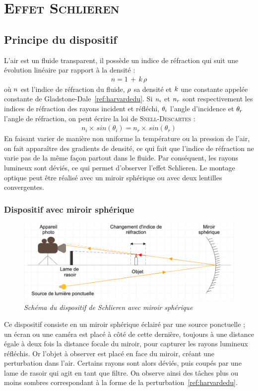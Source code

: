\renewcommand{\chaptername}{\scshape Partie}
\chapter{\normalfont \scshape Effet Schlieren}
\section{Principe du dispositif}
L'air est un fluide transparent, il possède un indice de réfraction qui suit une évolution linéaire par rapport à la densité :
\begin{align}
	n = 1\,+\,k\,\rho
\end{align}
où $\mathnormal{n}$ est l'indice de réfraction du fluide, $\mathnormal{\rho}$ sa densité et $\mathnormal{k}$ une constante appelée constante de Gladstone-Dale~\ref{ref:harvardedu}. Si $\mathnormal{n_i}$ et $\mathnormal{n_r}$ sont respectivement les indices de réfraction des rayons incident et réfléchi, $\mathnormal{\theta_i}$ l'angle d'incidence et $\mathnormal{\theta_r}$ l'angle de réfraction, on peut écrire la loi de \textsc{Snell-Descartes} :
\begin{align}
	n_i\times\,sin(\theta_i) = n_r\times\,sin(\theta_r) 
\end{align}
En faisant varier de manière non uniforme la température ou la pression de l'air, on fait apparaître des gradients de densité, ce qui fait que l'indice de réfraction ne varie pas de la même façon partout dans le fluide. Par conséquent, les rayons lumineux sont déviés, ce qui permet d'observer l'effet Schlieren. Le montage optique peut être réalisé avec un miroir sphérique ou avec deux lentilles convergentes.
\subsection{Dispositif avec miroir sphérique}
\begin{figure}[H]
	\centering
	\includegraphics[scale = 0.4]{figures/schlieren_miroir.png}
	\caption{\small{\textit{Schéma du dispositif de Schlieren avec miroir sphérique}}}
	\label{fig:schlieren_miroir}
\end{figure}
Ce dispositif consiste en un miroir sphérique éclairé par une source ponctuelle ; un écran ou une caméra est placé à côté de cette dernière, toujours à une distance égale à deux fois la distance focale du miroir, pour capturer les rayons lumineux réfléchis. Or l’objet à observer est placé en face du miroir, créant une perturbation dans l’air. Certains rayons sont alors déviés, puis coupés par une lame de rasoir qui agit en tant que filtre. On observe ainsi des tâches plus ou moins sombres correspondant à la forme de la perturbation~\ref{ref:harvardedu}.
